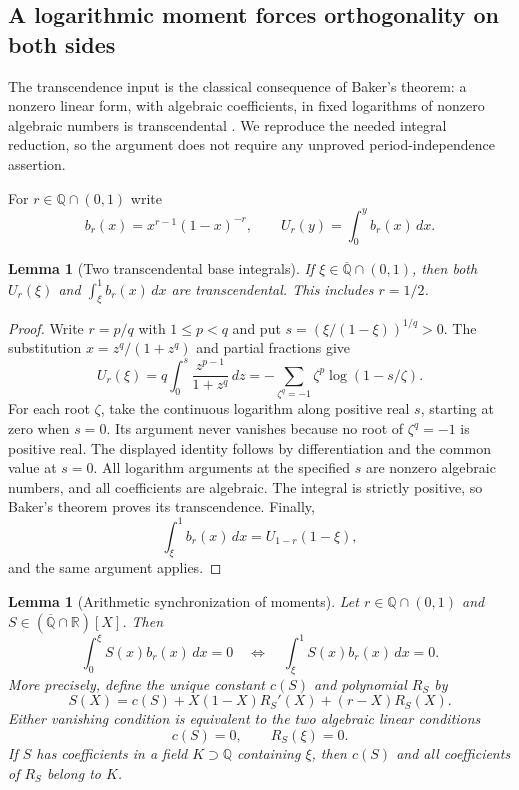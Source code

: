 \documentclass[11pt,a4paper]{article}
\newtheorem{lemma}[theorem]{Lemma}
\theoremstyle{definition}
\theoremstyle{remark}
\numberwithin{equation}{section}
\begin{document}
\subsection{A logarithmic moment forces orthogonality on both sides}

The transcendence input is the classical consequence of Baker's theorem:
a nonzero linear form, with algebraic coefficients, in fixed logarithms
of nonzero algebraic numbers is transcendental
\cite{p5:aq:BakerIII}. We reproduce the needed integral reduction, so the
argument does not require any unproved period-independence assertion.

For $r\in\mathbb Q\cap(0,1)$ write
\[
 b_r(x)=x^{r-1}(1-x)^{-r},\qquad
 U_r(y)=\int_0^y b_r(x)\,dx.
\]

\begin{lemma}[Two transcendental base integrals]\label{p8:aa:base}
If $\xi\in\overline{\mathbb Q}\cap(0,1)$, then both
$U_r(\xi)$ and $\int_\xi^1 b_r(x)\,dx$ are transcendental.
This includes $r=1/2$.
\end{lemma}

\begin{proof}
Write $r=p/q$ with $1\le p<q$ and put
$s=(\xi/(1-\xi))^{1/q}>0$. The substitution
$x=z^q/(1+z^q)$ and partial fractions give
\[
 U_r(\xi)=q\int_0^s\frac{z^{p-1}}{1+z^q}\,dz
 =-\sum_{\zeta^q=-1}\zeta^p\log(1-s/\zeta).
\]
For each root $\zeta$, take the continuous logarithm along positive
real $s$, starting at zero when $s=0$. Its argument never vanishes
because no root of $\zeta^q=-1$ is positive real. The displayed
identity follows by differentiation and the common value at $s=0$.
All logarithm arguments at the specified $s$ are nonzero algebraic
numbers, and all coefficients are algebraic. The integral is strictly
positive, so Baker's theorem proves its transcendence. Finally,
\[
 \int_\xi^1 b_r(x)\,dx=U_{1-r}(1-\xi),
\]
and the same argument applies.
\end{proof}

\begin{lemma}[Arithmetic synchronization of moments]
\label{p8:aa:synchronization}
Let $r\in\mathbb Q\cap(0,1)$ and
$S\in(\overline{\mathbb Q}\cap\mathbb R)[X]$. Then
\[
 \int_0^\xi S(x)b_r(x)\,dx=0
 \quad\Longleftrightarrow\quad
 \int_\xi^1 S(x)b_r(x)\,dx=0.
\]
More precisely, define the unique constant $c(S)$ and polynomial
$R_S$ by
\begin{equation}\label{p8:aa:reduction}
 S(X)=c(S)+X(1-X)R_S'(X)+(r-X)R_S(X).
\end{equation}
Either vanishing condition is equivalent to the two algebraic
linear conditions
\begin{equation}\label{p8:aa:algebraic-conditions}
 c(S)=0,\qquad R_S(\xi)=0.
\end{equation}
If $S$ has coefficients in a field $K\supset\mathbb Q$
containing $\xi$, then $c(S)$ and all coefficients of $R_S$
belong to $K$.
\end{lemma}
\end{document}
